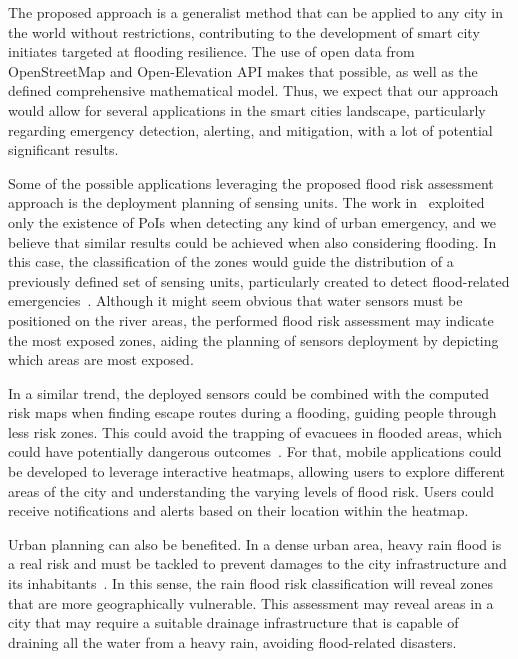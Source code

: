 \begin{refsection}
The proposed approach is a generalist method that can be applied to any city in the world without restrictions, contributing to the development of smart city initiates targeted at flooding resilience. The use of open data from OpenStreetMap and Open-Elevation API makes that possible, as well as the defined comprehensive mathematical model. Thus, we expect that our approach would allow for several applications in the smart cities landscape, particularly regarding emergency detection, alerting, and mitigation, with a lot of potential significant results.

Some of the possible applications leveraging the proposed flood risk assessment approach is the deployment planning of sensing units. The work in~\cite{positioning} exploited only the existence of PoIs when detecting any kind of urban emergency, and we believe that similar results could be achieved when also considering flooding. In this case, the classification of the zones would guide the distribution of a previously defined set of sensing units, particularly created to detect flood-related emergencies~\cite{floodhardware1,floodhardware2}. Although it might seem obvious that water sensors must be positioned on the river areas, the performed flood risk assessment may indicate the most exposed zones, aiding the planning of sensors deployment by depicting which areas are most exposed.

In a similar trend, the deployed sensors could be combined with the computed risk maps when finding escape routes during a flooding, guiding people through less risk zones. This could avoid the trapping of evacuees in flooded areas, which could have potentially dangerous outcomes~\cite{rescuing2,rescuing3}. For that, mobile applications could be developed to leverage interactive heatmaps, allowing users to explore different areas of the city and understanding the varying levels of flood risk. Users could receive notifications and alerts based on their location within the heatmap.

Urban planning can also be benefited. In a dense urban area, heavy rain flood is a real risk and must be tackled to prevent damages to the city infrastructure and its inhabitants~\cite{rainflood}. In this sense, the rain flood risk classification will reveal zones that are more geographically vulnerable. This assessment may reveal areas in a city that may require a suitable drainage infrastructure that is capable of draining all the water from a heavy rain, avoiding flood-related disasters.


\end{refsection}
